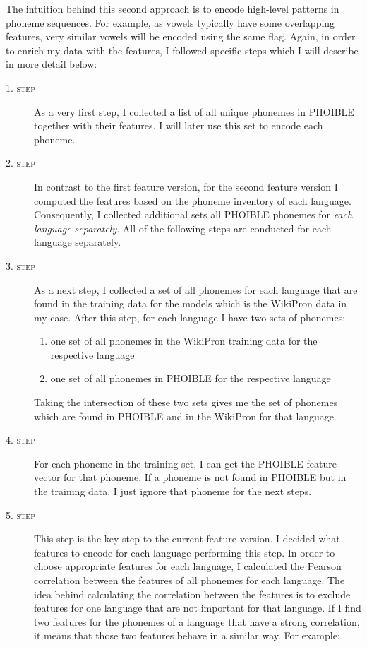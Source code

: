 The intuition behind this second approach is to encode high-level patterns in phoneme sequences. For example, as vowels typically have some overlapping features, very similar vowels will be encoded using the same flag. Again, in order to enrich my data with the features, I followed specific steps which I will describe in more detail below: 

\begin{description}
    \item[\textsc{1. step}] As a very first step, I collected a list of all unique phonemes in PHOIBLE together with their features. I will later use this set to encode each phoneme.
    \item[\textsc{2. step}] In contrast to the first feature version, for the second feature version I computed the features based on the phoneme inventory of each language. Consequently, I collected additional sets all PHOIBLE phonemes for \textit{each language separately}. All of the following steps are conducted for each language separately.
    \item[\textsc{3. step}] As a next step, I collected a set of all phonemes for each language that are found in the training data for the models which is the WikiPron data in my case. 
    After this step, for each language I have two sets of phonemes:
    \begin{enumerate}
        \item one set of all phonemes in the WikiPron training data for the respective language
        \item one set of all phonemes in PHOIBLE for the respective language
    \end{enumerate}
    Taking the intersection of these two sets gives me the set of phonemes which are found in PHOIBLE and in the WikiPron for that language.
    \item[\textsc{4. step}] For each phoneme in the training set, I can get the PHOIBLE feature vector for that phoneme. If a phoneme is not found in PHOIBLE but in the training data, I just ignore that phoneme for the next steps.
    \item[\textsc{5. step}] This step is the key step to the current feature version. I decided what features to encode for each language performing this step. In order to choose appropriate features for each language, I calculated the Pearson correlation between the features of all phonemes for each language. The idea behind calculating the correlation between the features is to exclude features for one language that are not important for that language. If I find two features for the phonemes of a language that have a strong correlation, it means that those two features behave in a similar way. For example:
    

\end{description}
